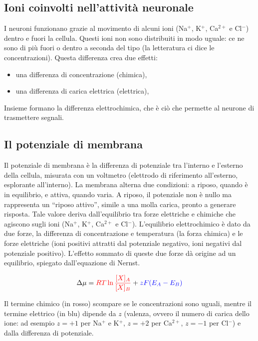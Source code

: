 \subsection{Ioni coinvolti nell'attività neuronale}

I neuroni funzionano grazie al movimento di alcuni ioni (Na$^{+}$, K$^{+}$, Ca$^{2+}$ e Cl$^{-}$) dentro e fuori la cellula. Questi ioni non sono distribuiti in modo uguale: ce ne sono di più fuori o dentro a seconda del tipo (la letteratura ci dice le concentrazioni).
Questa differenza crea due effetti:

\begin{itemize}
  \item una differenza di concentrazione (chimica),
  \item una differenza di carica elettrica (elettrica),
\end{itemize}
Insieme formano la differenza elettrochimica, che è ciò che permette al neurone di trasmettere segnali.


\subsection{Il potenziale di membrana}

Il potenziale di membrana è la differenza di potenziale tra l'interno e l'esterno della cellula, misurata con un voltmetro (elettrodo di riferimento all'esterno, esplorante all'interno). La membrana alterna due condizioni: a riposo, quando è in equilibrio, e attiva, quando varia.
A riposo, il potenziale non è nullo ma rappresenta un ``riposo attivo'', simile a una molla carica, pronto a generare risposta. Tale valore deriva dall'equilibrio tra forze elettriche e chimiche che agiscono sugli ioni (Na$^{+}$, K$^{+}$, Ca$^{2+}$ e Cl$^{-}$).
L'equilibrio elettrochimico è dato da due forze, la differenza di concentrazione e temperatura (la forza chimica) e le forze
elettriche (ioni positivi attratti dal potenziale negativo, ioni negativi dal potenziale positivo).
L'effetto sommato di queste due forze dà origine ad un equilibrio, spiegato dall'equazione di Nernst.

\[
\Delta\mu = \textcolor{red}{RT \ln \frac{[X]_A}{[X]_B}} + \textcolor{blue}{zF(E_A - E_B)}
\]

Il termine chimico (in rosso) scompare se le concentrazioni sono uguali, mentre il termine
elettrico (in blu) dipende da $z$ (valenza, ovvero il numero di carica dello ione: ad esempio
$z=+1$ per Na$^+$ e K$^+$, $z=+2$ per Ca$^{2+}$, $z=-1$ per Cl$^-$) e dalla differenza
di potenziale.

